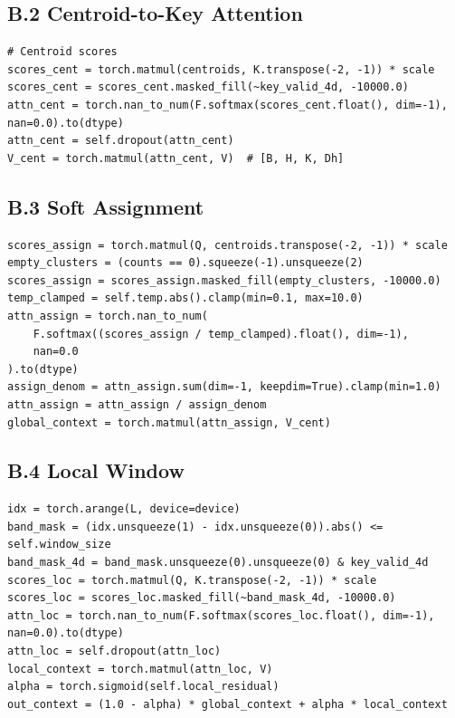 \subsection{B.2 Centroid-to-Key Attention}

\begin{lstlisting}
# Centroid scores
scores_cent = torch.matmul(centroids, K.transpose(-2, -1)) * scale
scores_cent = scores_cent.masked_fill(~key_valid_4d, -10000.0)
attn_cent = torch.nan_to_num(F.softmax(scores_cent.float(), dim=-1), nan=0.0).to(dtype)
attn_cent = self.dropout(attn_cent)
V_cent = torch.matmul(attn_cent, V)  # [B, H, K, Dh]
\end{lstlisting}

\subsection{B.3 Soft Assignment}

\begin{lstlisting}
scores_assign = torch.matmul(Q, centroids.transpose(-2, -1)) * scale
empty_clusters = (counts == 0).squeeze(-1).unsqueeze(2)
scores_assign = scores_assign.masked_fill(empty_clusters, -10000.0)
temp_clamped = self.temp.abs().clamp(min=0.1, max=10.0)
attn_assign = torch.nan_to_num(
    F.softmax((scores_assign / temp_clamped).float(), dim=-1),
    nan=0.0
).to(dtype)
assign_denom = attn_assign.sum(dim=-1, keepdim=True).clamp(min=1.0)
attn_assign = attn_assign / assign_denom
global_context = torch.matmul(attn_assign, V_cent)
\end{lstlisting}

\subsection{B.4 Local Window}

\begin{lstlisting}
idx = torch.arange(L, device=device)
band_mask = (idx.unsqueeze(1) - idx.unsqueeze(0)).abs() <= self.window_size
band_mask_4d = band_mask.unsqueeze(0).unsqueeze(0) & key_valid_4d
scores_loc = torch.matmul(Q, K.transpose(-2, -1)) * scale
scores_loc = scores_loc.masked_fill(~band_mask_4d, -10000.0)
attn_loc = torch.nan_to_num(F.softmax(scores_loc.float(), dim=-1), nan=0.0).to(dtype)
attn_loc = self.dropout(attn_loc)
local_context = torch.matmul(attn_loc, V)
alpha = torch.sigmoid(self.local_residual)
out_context = (1.0 - alpha) * global_context + alpha * local_context
\end{lstlisting}

